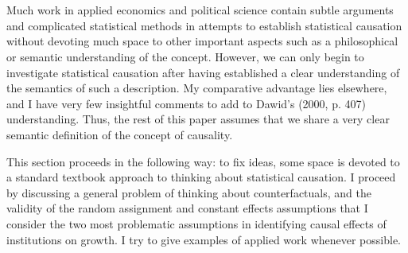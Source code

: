\documentclass[12pt]{article}%
\begin{document}
\section{}
Much work in applied economics and political science contain subtle arguments and complicated statistical methods in attempts to establish statistical causation without devoting much space to other important aspects such as a philosophical or semantic understanding of the concept. However, we can only begin to investigate statistical causation after having established a clear understanding of the semantics of such a description. My comparative advantage lies elsewhere, and I have very few insightful comments to add to Dawid's (2000, p. 407) understanding. Thus, the rest of this paper assumes that we share a very clear semantic definition of the concept of causality. 

This section proceeds in the following way: to fix ideas, some space is devoted to a standard textbook approach to thinking about statistical causation. I proceed by discussing a general problem of thinking about counterfactuals, and the validity of the random assignment and constant effects assumptions that I consider the two most problematic assumptions in identifying causal effects of institutions on growth. I try to give examples of applied work whenever possible. 
\end{document}
